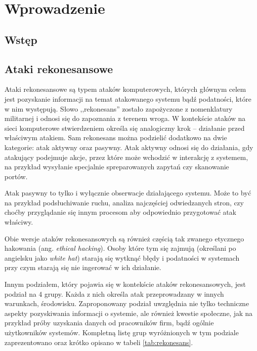 \chapter{Wprowadzenie}

\section{Wstęp}


\section{Ataki rekonesansowe}
Ataki rekonesansowe są typem ataków komputerowych, których głównym celem jest pozyskanie informacji na temat atakowanego systemu bądź
podatności, które w nim występują. Słowo ,,rekonesans'' zostało zapożyczone z nomenklatury militarnej i odnosi się do zapoznania z
terenem wroga. W kontekście ataków na sieci komputerowe stwierdzeniem określa się analogiczny krok -- działanie przed właściwym atakiem.
Sam rekonesans można podzielić dodatkowo na dwie kategorie: atak aktywny oraz pasywny.
Atak aktywny odnosi się do działania, gdy atakujący podejmuje akcje, przez które może wchodzić w interakcję z systemem, na przykład
wysyłanie specjalnie spreparowanych zapytań czy skanowanie portów.

Atak pasywny to tylko i wyłącznie obserwacje działającego systemu. Może to być na przykład podsłuchiwanie ruchu, analiza najczęściej
odwiedzanych stron, czy choćby przyglądanie się innym procesom aby odpowiednio przygotować atak właściwy.

Obie wersje ataków rekonesansowych są również częścią tak zwanego etycznego hakowania (ang. \textit{ethical hacking}). Osoby które
tym się zajmują (określani po angielsku jako \textit{white hat}) starają się wytknąć błędy i podatności w systemach przy czym starają
się nie ingerować w ich działanie.

Innym podziałem, który pojawia się w kontekście ataków rekonesansowych, jest podział na 4 grupy. Każda z nich określa atak
przeprowadzany w innych warunkach, środowisku. Zaproponowany podział uwzględnia nie tylko techniczne aspekty pozyskiwania informacji
o systemie, ale również kwestie społeczne, jak na przykład próby uzyskania danych od pracowników firm, bądź ogólnie użytkowników
systemów. Kompletną listę grup wyróżnionych w tym podziale zaprezentowano oraz krótko opisano w tabeli \ref{tab:rekonesans}.

